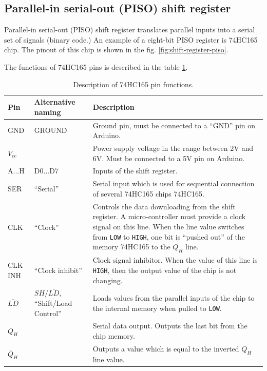 \documentclass[../sparc.tex]{subfiles}
\begin{document}
\subsection{Parallel-in serial-out (PISO) shift register}

Parallel-in serial-out (PISO) shift register translates parallel inputs into a
serial set of signals (binary code.)  An example of a eight-bit PISO register is
74HC165\cite{ti:sn74hc165} chip.  The pinout of this chip is shown in the
fig. \ref{fig:shift-register-piso}.


The functions of 74HC165 pins is described in the table
\ref{table:shift-register-piso-pins}.

\begin{table}[H]
  \centering
  \small
  \begin{tabular}{ | m{1.2cm} | m{2.55cm} | m{6.75cm} | }
    \hline
    \textbf{Pin}
    & \textbf{Alternative naming}
    & \textbf{Description} \\
    \hline
    GND
    & GROUND
    & Ground pin, must be connected to a ``GND'' pin on Arduino. \\
    \hline
    $V_{cc}$
    &
    & Power supply voltage in the range between 2V and 6V.
    Must be connected to a 5V pin on Arduino. \\
    \hline
    A...H
    & D0...D7
    & Inputs of the shift register. \\
    \hline
    SER
    & ``Serial''
    & Serial input which is used for sequential connection of several 74HC165
    chips 74HC165. \\
    \hline
    CLK
    & ``Clock''
    & Controls the data downloading from the shift register.  A micro-controller
    must provide a clock signal on this line.  When the line value switches from
    \texttt{LOW} to \texttt{HIGH}, one bit is ``pushed out'' of the memory
    74HC165 to the $Q_H$ line. \\
    \hline
    CLK INH
    & ``Clock inhibit''
    & Clock signal inhibitor.  When the value of this line is \texttt{HIGH},
    then the output value of the chip is not changing. \\
    \hline
    $\overline{LD}$
    & $SH/\overline{LD}$, ``Shift/Load Control''
    & Loads values from the parallel inputs of the chip to the internal memory
    when pulled to \texttt{LOW}. \\
    \hline
    $Q_H$
    &
    & Serial data output.  Outputs the last bit from the chip memory. \\
    \hline
    $\overline{Q}_H$
    &
    & Outputs a value which is equal to the inverted $Q_H$ line value. \\
    \hline
  \end{tabular}
  \caption{Description of 74HC165 pin functions.}
  \label{table:shift-register-piso-pins}
\end{table}
\end{document}
